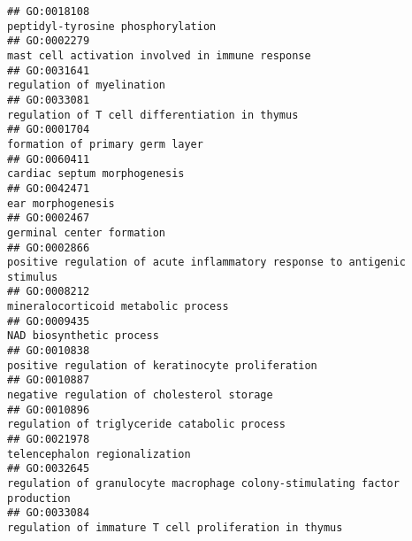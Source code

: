 \documentclass[
]{article}
\begin{document}
\begin{verbatim}
## GO:0018108                                                                                                                peptidyl-tyrosine phosphorylation
## GO:0002279                                                                                                 mast cell activation involved in immune response
## GO:0031641                                                                                                                        regulation of myelination
## GO:0033081                                                                                                   regulation of T cell differentiation in thymus
## GO:0001704                                                                                                                  formation of primary germ layer
## GO:0060411                                                                                                                     cardiac septum morphogenesis
## GO:0042471                                                                                                                                ear morphogenesis
## GO:0002467                                                                                                                        germinal center formation
## GO:0002866                                                                         positive regulation of acute inflammatory response to antigenic stimulus
## GO:0008212                                                                                                              mineralocorticoid metabolic process
## GO:0009435                                                                                                                         NAD biosynthetic process
## GO:0010838                                                                                                positive regulation of keratinocyte proliferation
## GO:0010887                                                                                                       negative regulation of cholesterol storage
## GO:0010896                                                                                                     regulation of triglyceride catabolic process
## GO:0021978                                                                                                                    telencephalon regionalization
## GO:0032645                                                                        regulation of granulocyte macrophage colony-stimulating factor production
## GO:0033084                                                                                            regulation of immature T cell proliferation in thymus

\end{verbatim}
\end{document}
